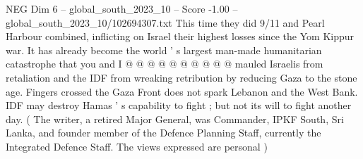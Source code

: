 \begin{textsample}{NEG Dim 6 – global\_south\_2023\_10 – Score -1.00 – global\_south\_2023\_10/102694307.txt}
This time they did 9/11 and Pearl Harbour combined, inflicting on Israel their highest losses since the Yom Kippur war.
It has already become the world ' s largest man-made humanitarian catastrophe that you and I @ @ @ @ @ @ @ @ @ @ mauled Israelis from retaliation and the IDF from wreaking retribution by reducing Gaza to the stone age.
Fingers crossed the Gaza Front does not spark Lebanon and the West Bank.
IDF may destroy Hamas ' s capability to fight ; but not its will to fight another day. ( The writer, a retired Major General, was Commander, IPKF South, Sri Lanka, and founder member of the Defence Planning Staff, currently the Integrated Defence Staff.
The views expressed are personal )

\end{textsample}
